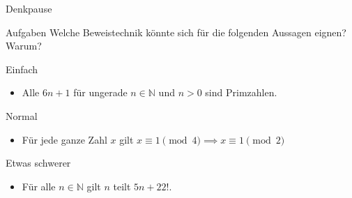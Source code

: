%
%
%
%

{
\begin{frame}[fragile]{Denkpause}
    \begin{alertblock}{Aufgaben}
    Welche Beweistechnik könnte sich für die folgenden Aussagen eignen? Warum?
    \end{alertblock}
    
    \begin{block}{Einfach}
        \begin{itemize}
            \item Alle $6n+1$ für ungerade $n \in \mathbb{N}$ und $n > 0$ sind Primzahlen.
        \end{itemize}
    \end{block}
    \begin{block}{Normal}
    \begin{itemize}
            \item Für jede ganze Zahl $x$ gilt $x\equiv 1\pmod 4 \implies x\equiv 1\pmod 2$
    \end{itemize}
    \end{block}
    \begin{block}{Etwas schwerer}
        \begin{itemize}
            \item Für alle $n \in \mathbb{N}$ gilt $n$ teilt $5n + 22!$.
        \end{itemize}
    \end{block}
\end{frame}
}

